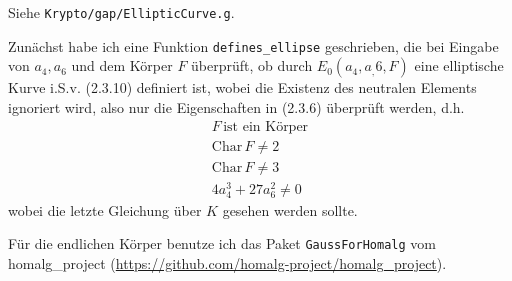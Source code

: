Siehe \texttt{Krypto/gap/EllipticCurve.g}.

Zunächst habe ich eine Funktion \texttt{defines_ellipse} geschrieben, die bei Eingabe von $a_{4}, a_{6}$ und dem Körper $F$ überprüft,
ob durch $E_{0}(a_{4}, a_,{6}, F)$ eine elliptische Kurve i.S.v. (2.3.10) definiert ist, wobei die Existenz des neutralen Elements ignoriert wird,
also nur die Eigenschaften in (2.3.6) überprüft werden, d.h.
\begin{align}
F \,\text{ist ein Körper}\\
\mathrm{Char}\,F \neq 2 \\
\mathrm{Char}\,F \neq 3 \\
4a_{4}^{3} + 27a_{6}^{2} \neq 0 
\end{align}
wobei die letzte Gleichung über $K$ gesehen werden sollte.

Für die endlichen Körper benutze ich das Paket \texttt{GaussForHomalg} vom homalg_project (\url{https://github.com/homalg-project/homalg_project}).
